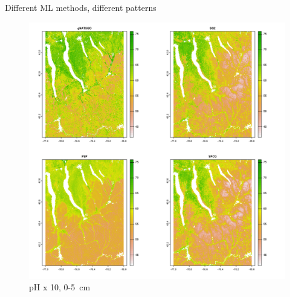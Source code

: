 \documentclass[aspectratio=169]{beamer}
\begin{document}
\begin{frame}{Different ML methods, different patterns}
        \begin{figure}
        \centering
        \includegraphics[height=0.75\textheight]{./graphics_david/Fig07.png}
        \\{pH x 10, 0-5~cm}
    \end{figure}
\end{frame}
\end{document}
